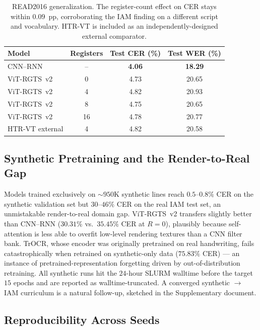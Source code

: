 \begin{table}[t]
\centering
\small
\caption{READ2016 generalization. The register-count effect on CER stays within $0.09$~pp, corroborating the IAM finding on a different script and vocabulary. HTR-VT is included as an independently-designed external comparator.}
\label{tab:read2016}
\begin{tabular}{lccc}
\toprule
Model & Registers & Test CER (\%) & Test WER (\%) \\
\midrule
CNN--RNN               & --  & \textbf{4.06} & \textbf{18.29} \\
ViT-RGTS~v2            & 0   & 4.73          & 20.65 \\
ViT-RGTS~v2            & 4   & 4.82          & 20.93 \\
ViT-RGTS~v2            & 8   & 4.75          & 20.65 \\
ViT-RGTS~v2            & 16  & 4.78          & 20.77 \\
HTR-VT external        & 4   & 4.82          & 20.58 \\
\bottomrule
\end{tabular}
\end{table}

\subsection{Synthetic Pretraining and the Render-to-Real Gap}
\label{sec:res_synth}

Models trained exclusively on ${\sim}950$K synthetic lines reach $0.5$--$0.8\%$ CER on the synthetic validation set but $30$--$46\%$ CER on the real IAM test set, an unmistakable render-to-real domain gap. ViT-RGTS~v2 transfers slightly better than CNN--RNN ($30.31\%$ vs.\ $35.45\%$ CER at $R = 0$), plausibly because self-attention is less able to overfit low-level rendering textures than a CNN filter bank. TrOCR, whose encoder was originally pretrained on real handwriting, fails catastrophically when retrained on synthetic-only data ($75.83\%$ CER) --- an instance of pretrained-representation forgetting driven by out-of-distribution retraining. All synthetic runs hit the $24$-hour SLURM walltime before the target $15$ epochs and are reported as walltime-truncated. A converged synthetic $\rightarrow$ IAM curriculum is a natural follow-up, sketched in the Supplementary document.

\subsection{Reproducibility Across Seeds}
\label{sec:res_seeds}

